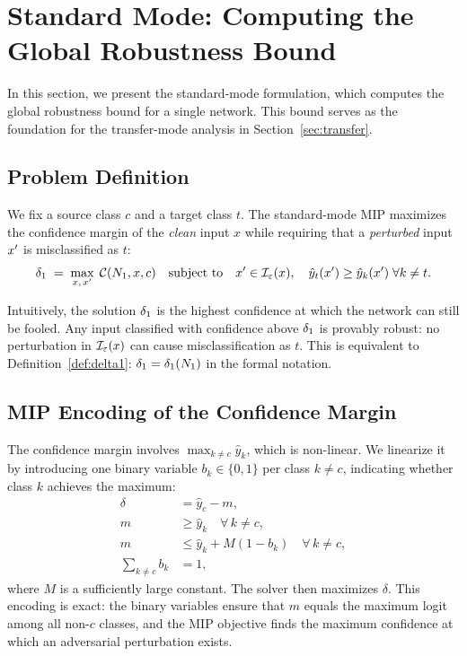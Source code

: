 \section{Standard Mode: Computing the Global Robustness Bound}
\label{sec:standard}

In this section, we present the standard-mode formulation, which computes the global robustness bound for a single network. This bound serves as the foundation for the transfer-mode analysis in Section~\ref{sec:transfer}.

\subsection{Problem Definition}

We fix a source class $c$ and a target class $t$. The standard-mode MIP maximizes the confidence margin of the \emph{clean} input $x$ while requiring that a \emph{perturbed} input $x'$ is misclassified as $t$:
\begin{equation}
  \label{eq:standard-obj}
  \delta_1 \;=\; \max_{x,\,x'}\; \mathcal{C}(N_1,x,c)
  \quad \text{subject to} \quad
  x' \in \mathcal{I}_\varepsilon(x),\quad
  \hat{y}_t(x') \ge \hat{y}_k(x')\;\forall k \neq t.
\end{equation}

Intuitively, the solution $\delta_1$ is the highest confidence at which the network can still be fooled. Any input classified with confidence above $\delta_1$ is provably robust: no perturbation in $\mathcal{I}_\varepsilon(x)$ can cause misclassification as $t$. This is equivalent to Definition~\ref{def:delta1}: $\delta_1 = \delta_1(N_{1})$ in the formal notation.

\subsection{MIP Encoding of the Confidence Margin}

The confidence margin involves $\max_{k \neq c} \hat{y}_k$, which is non-linear. We linearize it by introducing one binary variable $b_k \in \{0,1\}$ per class $k \neq c$, indicating whether class $k$ achieves the maximum:
\begin{align*}
  \delta &= \hat{y}_c - m, \\
  m &\ge \hat{y}_k \quad \forall\, k \neq c, \\
  m &\le \hat{y}_k + M(1 - b_k) \quad \forall\, k \neq c, \\
  \sum_{k \neq c} b_k &= 1,
\end{align*}
where $M$ is a sufficiently large constant. The solver then maximizes $\delta$. This encoding is exact: the binary variables ensure that $m$ equals the maximum logit among all non-$c$ classes, and the MIP objective finds the maximum confidence at which an adversarial perturbation exists.
